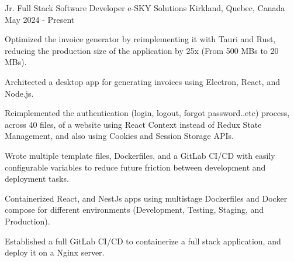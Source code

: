 

\begin{cventries}

  \cventry
   {Jr. Full Stack Software Developer} %
    {e-SKY Solutions} %
    {Kirkland, Quebec, Canada} %
    {May 2024 - Present} %
    {
      \begin{cvitems} %
        \item {Optimized the invoice generator by reimplementing it with Tauri and Rust, reducing the production size of the application by 25x (From 500 MBs to 20 MBs).}
        \item {Architected a desktop app for generating invoices using Electron, React, and Node.js.}
        \item {Reimplemented the authentication (login, logout, forgot password..etc) process, across 40 files, of a website using React Context instead of Redux State Management, and also using Cookies and Session Storage APIs.}
        \item {Wrote multiple template files, Dockerfiles, and a GitLab CI/CD with easily configurable variables to reduce future friction between development and deployment tasks.}
        \item {Containerized React, and NestJs apps using multistage Dockerfiles and Docker compose for different environments (Development, Testing, Staging, and Production).}
        \item{Established a full GitLab CI/CD to containerize a full stack application, and deploy it on a Nginx server.}
      \end{cvitems}
    }
    


\end{cventries}
